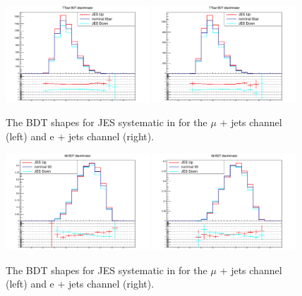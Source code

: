 
\begin{figure}[ht!]
    \includegraphics[width=0.48\textwidth]{images/Run2/Sys/JESsystt.pdf}
    \includegraphics[width=0.48\textwidth]{images/Run2/Sys/JESsystt_e.pdf}     
    \caption{The BDT shapes for JES systematic in \ttbar for the $\mu$ + jets channel (left) and e + jets channel (right).}
    \label{fig:SysShapesJEStt}
\end{figure}

\begin{figure}[ht!]
    \includegraphics[width=0.48\textwidth]{images/Run2/Sys/JESsystttt.pdf}
    \includegraphics[width=0.48\textwidth]{images/Run2/Sys/JESsystttt_e.pdf}     
    \caption{The BDT shapes for JES systematic in \tttt for the $\mu$ + jets channel (left) and e + jets channel (right).}
    \label{fig:SysShapesJEStttt}
\end{figure}

